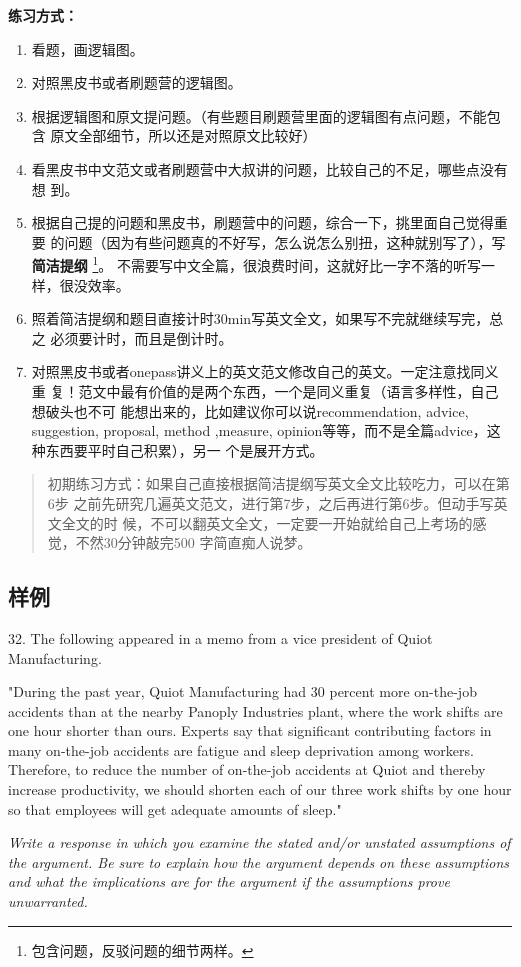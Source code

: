 \documentclass[cn,plain]{./src/qyxfbook}
\begin{document}
\textbf{练习方式：}
\begin{enumerate}
    \item 看题，画逻辑图。
    \item 对照黑皮书或者刷题营的逻辑图。
    \item 根据逻辑图和原文提问题。（有些题目刷题营里面的逻辑图有点问题，不能包含
    原文全部细节，所以还是对照原文比较好）
    \item 看黑皮书中文范文或者刷题营中大叔讲的问题，比较自己的不足，哪些点没有想
    到。
    \item 根据自己提的问题和黑皮书，刷题营中的问题，综合一下，挑里面自己觉得重要
    的问题（因为有些问题真的不好写，怎么说怎么别扭，这种就别写了），写\textbf{简洁提纲}
    \footnote{包含问题，反驳问题的细节两样。}。
    不需要写中文全篇，很浪费时间，这就好比一字不落的听写一样，很没效率。
    \item 照着简洁提纲和题目直接计时30min写英文全文，如果写不完就继续写完，总之
    必须要计时，而且是倒计时。
    \item 对照黑皮书或者onepass讲义上的英文范文修改自己的英文。一定注意找同义重
    复！范文中最有价值的是两个东西，一个是同义重复（语言多样性，自己想破头也不可
    能想出来的，比如建议你可以说recommendation, advice, suggestion,
    proposal, method ,measure,
    opinion等等，而不是全篇advice，这种东西要平时自己积累），另一
    个是展开方式。
\end{enumerate}

\begin{quotation}
初期练习方式：如果自己直接根据简洁提纲写英文全文比较吃力，可以在第6步
之前先研究几遍英文范文，进行第7步，之后再进行第6步。但动手写英文全文的时
候，不可以翻英文全文，一定要一开始就给自己上考场的感觉，不然30分钟敲完500
字简直痴人说梦。
\end{quotation}


\subsection{样例}
\begin{tcolorbox}
32. The following appeared in a memo from a vice president of Quiot
Manufacturing.

"During the past year, Quiot Manufacturing had 30 percent more
on-the-job accidents than at the nearby Panoply Industries plant, where
the work shifts are one hour shorter than ours. Experts say that
significant contributing factors in many on-the-job accidents are
fatigue and sleep deprivation among workers. Therefore, to reduce the
number of on-the-job accidents at Quiot and thereby increase
productivity, we should shorten each of our three work shifts by one
hour so that employees will get adequate amounts of sleep."

\emph{Write a response in which you examine the stated and/or unstated
assumptions of the argument. Be sure to explain how the argument depends
on these assumptions and what the implications are for the argument if
the assumptions prove unwarranted.}
\end{tcolorbox}
\end{document}
